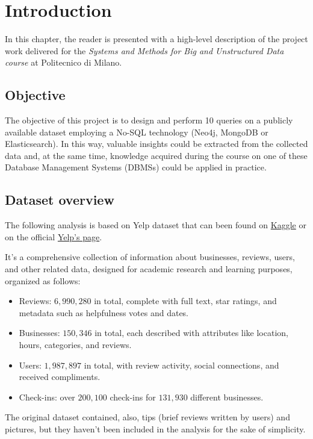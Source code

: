 \documentclass{Configuration_Files/PoliMi3i_thesis}
\begin{document}
\chapter{Introduction}
\label{ch:chapter_one}

In this chapter, the reader is presented with a high-level description of the project work delivered for the \textit{Systems and
Methods for Big and Unstructured Data course} at Politecnico di Milano.

\section{Objective}
\label{sec:Objective}
The objective of this project is to design and perform 10 queries on a publicly available dataset employing a No-SQL technology (Neo4j, MongoDB or Elasticsearch). In this way, valuable insights could be extracted from the collected data and, at the same time, knowledge acquired during the course on one of these Database Management Systems (DBMSs) could be applied in practice.

\section{Dataset overview}
The following analysis is based on Yelp dataset that can been found on \href{https://www.kaggle.com/datasets/yelp-dataset/yelp-dataset}{Kaggle} or on the official \href{https://www.yelp.com/dataset}{Yelp's page}. 

It's a comprehensive collection of information about businesses, reviews, users, and other related data, designed for academic research and learning purposes, organized as follows:
\begin{itemize}
    \item{Reviews}: $6,990,280$ in total, complete with full text, star ratings, and metadata such as helpfulness votes and dates.
    \item{Businesses}: $150,346$ in total, each described with attributes like location, hours, categories, and reviews.
    \item{Users}: $1,987,897$ in total, with review activity, social connections, and received compliments.
    \item{Check-ins}: over $200,100$ check-ins for $131,930$ different businesses.
\end{itemize}

The original dataset contained, also, tips (brief reviews written by users) and pictures, but they haven't  been included in the analysis for the sake of simplicity. 
\end{document}
